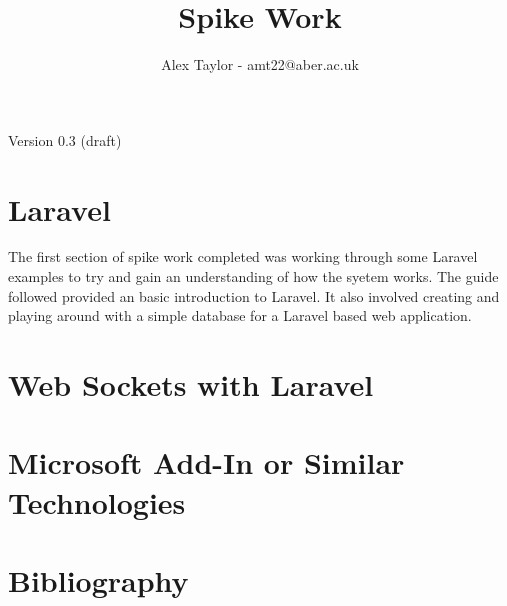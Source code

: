 \documentclass{article}
\title{Spike Work}
\author{Alex Taylor - amt22@aber.ac.uk}
\begin{document}
\maketitle
\begin{center}
	Version 0.3 (draft)
\end{center}
\tableofcontents
\thispagestyle{empty}
\newpage

\section{Laravel}
The first section of spike work completed was working through some Laravel examples to try and gain an understanding of how the syetem works. The guide\cite{Laravel5Guide} followed provided an basic introduction to Laravel. It also involved creating and playing around with a simple database for a Laravel based web application.
\newpage

\section{Web Sockets with Laravel}
\newpage

\section{Microsoft Add-In or Similar Technologies}
\newpage

\section{Bibliography}


\end{document}
